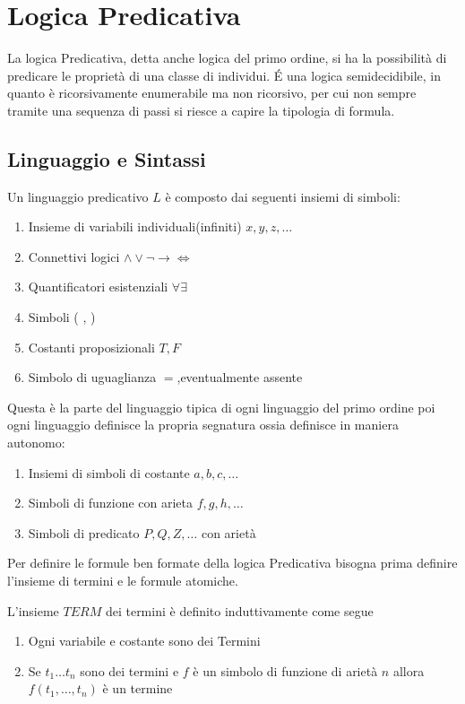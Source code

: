 \chapter{Logica Predicativa}
La logica Predicativa, detta anche logica del primo ordine, si ha la possibilità
di predicare le proprietà di una classe di individui.\newline
É una logica semidecidibile, in quanto è ricorsivamente enumerabile ma non ricorsivo,
per cui non sempre tramite una sequenza di passi si riesce a capire la tipologia di formula.

\section{Linguaggio e Sintassi}
Un linguaggio predicativo $L$ è composto dai seguenti insiemi di simboli:
\begin{enumerate}
    \item Insieme di variabili individuali(infiniti) $x,y,z,\dots$
    \item Connettivi logici $\land \lor \neg \rightarrow \iff$
    \item Quantificatori esistenziali $\forall \exists$
    \item Simboli ( , )
    \item Costanti proposizionali $T,F$
    \item Simbolo di uguaglianza $=$,eventualmente assente
\end{enumerate}
Questa è la parte del linguaggio tipica di ogni linguaggio del primo ordine poi
ogni linguaggio definisce la propria segnatura ossia definisce in maniera autonomo:
\begin{enumerate}
    \item Insiemi di simboli di costante $a,b,c,\dots$
    \item Simboli di funzione con arieta $f,g,h,\dots$
    \item Simboli di predicato $P,Q,Z,\dots$ con arietà
\end{enumerate}


Per definire le formule ben formate della logica Predicativa bisogna prima definire
l'insieme di termini e le formule atomiche.

\begin{defi}
    L'insieme $TERM$ dei termini è definito induttivamente come segue
    \begin{enumerate}
        \item Ogni variabile e costante sono dei Termini
        \item Se $t_1 \dots t_n$ sono dei termini e $f$ è un simbolo di funzione di arietà $n$
              allora $f(t_1,\dots,t_n)$ è un termine
    \end{enumerate}
\end{defi}

